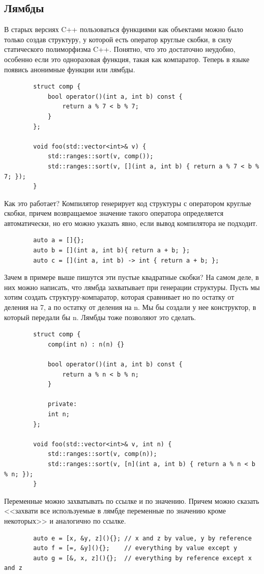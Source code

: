 \documentclass[12pt, a4paper]{article}
\begin{document}
	\subsection{Лямбды}
	В старых версиях C++ пользоваться функциями как объектами можно было только создав структуру, у которой есть оператор круглые скобки, в силу статического полиморфизма C++. Понятно, что это достаточно неудобно, особенно если это одноразовая функция, такая как компаратор. Теперь в языке появись анонимные функции или лямбды.
	\begin{verbatim}
		struct comp {
			bool operator()(int a, int b) const {
				return a % 7 < b % 7;
			}
		};
		
		void foo(std::vector<int>& v) {
			std::ranges::sort(v, comp());
			std::ranges::sort(v, [](int a, int b) { return a % 7 < b % 7; });
		}
	\end{verbatim}
	Как это работает? Компилятор генерирует код структуры с оператором круглые скобки, причем возвращаемое значение такого оператора определяется автоматически, но его можно указать явно, если вывод компилятора не подходит.
	\begin{verbatim}
		auto a = []{};
		auto b = [](int a, int b){ return a + b; };
		auto c = [](int a, int b) -> int { return a + b; };
	\end{verbatim}
	Зачем в примере выше пишутся эти пустые квадратные скобки? На самом деле, в них можно написать, что лямбда захватывает при генерации структуры. Пусть мы хотим создать структуру-компаратор, которая сравнивает но по остатку от деления на 7, а по остатку от деления на n. Мы бы создали у нее конструктор, в который передали бы n. Лямбды тоже позволяют это сделать.
	\begin{verbatim}
		struct comp {
			comp(int n) : n(n) {}
			
			bool operator()(int a, int b) const {
				return a % n < b % n;
			}
			
			private:
			int n;
		};
		
		void foo(std::vector<int>& v, int n) {
			std::ranges::sort(v, comp(n));
			std::ranges::sort(v, [n](int a, int b) { return a % n < b % n; });
		}
	\end{verbatim}
	Переменные можно захватывать по ссылке и по значению. Причем можно сказать <<захвати все используемые в лямбде переменные по значению кроме некоторых>> и аналогично по ссылке.
	\begin{verbatim}
		auto e = [x, &y, z](){}; // x and z by value, y by reference
		auto f = [=, &y](){};    // everything by value except y
		auto g = [&, x, z](){};  // everything by reference except x and z
	\end{verbatim}
\end{document}

